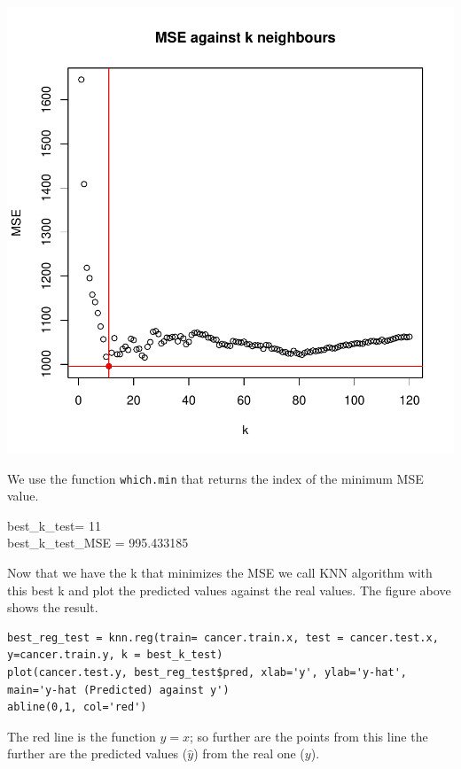 \documentclass[]{report}
\begin{document}
\begin{center}	
		\includegraphics{Figures/knn_test.pdf}
\end{center}

 We use the function \texttt{which.min} that returns the index of the minimum MSE value.\\

\begin{center} 
	best\_k\_test= 11 \\
	best\_k\_test\_MSE = 995.433185
\end{center}

Now that we have the k that minimizes the MSE we call KNN algorithm with this best k and plot the predicted values against the real values. The figure above shows the result.

\begin{lstlisting}
best_reg_test = knn.reg(train= cancer.train.x, test = cancer.test.x, y=cancer.train.y, k = best_k_test)
plot(cancer.test.y, best_reg_test$pred, xlab='y', ylab='y-hat', main='y-hat (Predicted) against y')
abline(0,1, col='red')
\end{lstlisting}

The red line is the function $y=x$; so further are the points from this line the further are the predicted values ($\hat{y}$) from the real one ($y$).
	
\end{document}
